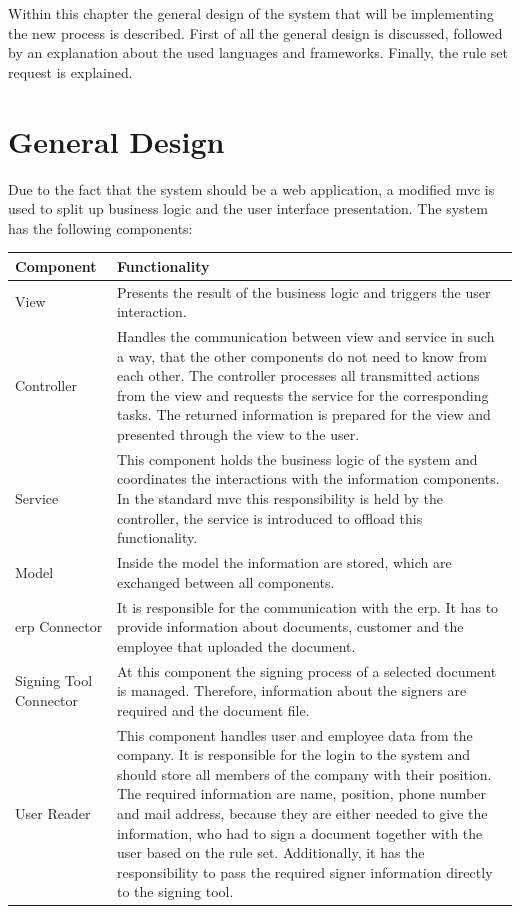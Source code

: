 Within this chapter the general design of the system that will be implementing the new process is described. First of all the general design is discussed, followed by an explanation about the used languages and frameworks. Finally, the rule set request is explained. 

\section{General Design}
Due to the fact that the system should be a web application, a modified \gls{mvc} is used to split up business logic and the user interface presentation. The system has the following components:

	\begin{longtable}{|p{4cm}|p{11cm}|} \hline
		\rowcolor{Gray}Component & Functionality \\ \hline
		View & Presents the result of the  business logic and triggers the user interaction.\\ \hline
		Controller & Handles the communication between view and service in such a way, that the other components do not need to know from each other. The controller processes all transmitted actions from the view and requests the service for the corresponding tasks. The returned information is prepared for the view and presented through the view to the user. \\ \hline
		Service & This component holds the business logic of the system and coordinates the interactions with the information components. In the standard \gls{mvc} this responsibility is held by the controller, the service is introduced to offload this functionality.\\ \hline
		Model & Inside the model the information are stored, which are exchanged between all components.\\ \hline
		\Gls{erp} Connector & It is responsible for the communication with the \gls{erp}. It has to provide information about documents, customer and the employee that uploaded the document. \\ \hline
		Signing Tool Connector & At this component the signing process of a selected document is managed. Therefore, information about the signers are required and the document file. \\ \hline
		User Reader & This component handles user and employee data from the company. It is responsible for the login to the system and should store all members of the company with their position. The required information are name, position, phone number and mail address, because they are either needed to give the information, who had to sign a document together with the user based on the rule set. Additionally, it has the responsibility to pass the required signer information directly to the signing tool. \\ \hline

\end{longtable}
